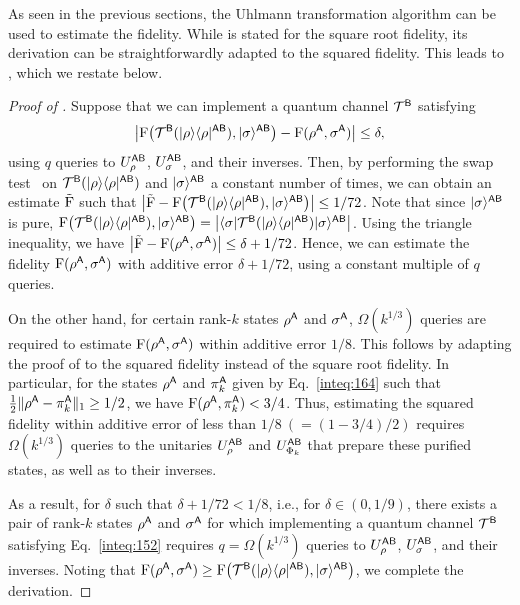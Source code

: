 As seen in the previous sections, the Uhlmann transformation algorithm can be used to estimate the fidelity. While  is stated for the square root fidelity, its derivation can be straightforwardly adapted to the squared fidelity. 
This leads to , which we restate below.



\corloweruhlquery*



\begin{proof}[Proof of ]


Suppose that we can implement a quantum channel ${\mathcal{T}}^{\mathsf{B}}$ satisfying
\begin{align}
    \label{inteq:152}
    \big|{\mathrm{F}}\big({\mathcal{T}}^{\mathsf{B}}(|\rho\rangle\langle\rho|^{{\mathsf{A}}{\mathsf{B}}}), |\sigma\rangle^{{\mathsf{A}}{\mathsf{B}}}\big) - {\mathrm{F}}(\rho^{\mathsf{A}}, \sigma^{\mathsf{A}})\big| \leq \delta,
\end{align}
using $q$ queries to $U_\rho^{{\mathsf{A}}{\mathsf{B}}}$, $U_\sigma^{{\mathsf{A}}{\mathsf{B}}}$, and their inverses.
Then, by performing the swap test~\cite{Barenco1997stabQCsymm, Buhrman2001fingerprint, Nishimura2025ASurveySWAPtest} on ${\mathcal{T}}^{\mathsf{B}}(|\rho\rangle\langle\rho|^{{\mathsf{A}}{\mathsf{B}}})$ and $|\sigma\rangle^{{\mathsf{A}}{\mathsf{B}}}$ a constant number of times, we can obtain an estimate $\tilde{{\mathrm{F}}}$ such that $\big|\tilde{{\mathrm{F}}} - {\mathrm{F}}\big({\mathcal{T}}^{\mathsf{B}}(|\rho\rangle\langle\rho|^{{\mathsf{A}}{\mathsf{B}}}), |\sigma\rangle^{{\mathsf{A}}{\mathsf{B}}}\big)\big| \leq 1/72$.
Note that since $|\sigma\rangle^{{\mathsf{A}}{\mathsf{B}}}$ is pure, ${\mathrm{F}}\big({\mathcal{T}}^{\mathsf{B}}(|\rho\rangle\langle\rho|^{{\mathsf{A}}{\mathsf{B}}}), |\sigma\rangle^{{\mathsf{A}}{\mathsf{B}}}\big) = \big|\langle\sigma|{\mathcal{T}}^{\mathsf{B}}(|\rho\rangle\langle\rho|^{{\mathsf{A}}{\mathsf{B}}})|\sigma\rangle^{{\mathsf{A}}{\mathsf{B}}}\big|$.
Using the triangle inequality, we have $\big|\tilde{{\mathrm{F}}} - {\mathrm{F}}(\rho^{\mathsf{A}}, \sigma^{\mathsf{A}})\big| \leq \delta + 1/72$.
Hence, we can estimate the fidelity ${\mathrm{F}}(\rho^{\mathsf{A}}, \sigma^{\mathsf{A}})$ with additive error $\delta + 1/72$, using a constant multiple of $q$ queries.


On the other hand, for certain rank-$k$ states $\rho^{\mathsf{A}}$ and $\sigma^{\mathsf{A}}$, $\Omega(k^{1/3})$ queries are required to estimate ${\mathrm{F}}(\rho^{\mathsf{A}}, \sigma^{\mathsf{A}})$ within additive error $1/8$.
This follows by adapting the proof of  to the squared fidelity instead of the square root fidelity. 
In particular, for the states $\rho^{\mathsf{A}}$ and $\pi_k^{\mathsf{A}}$ given by Eq.~\eqref{inteq:164} such that $\frac{1}{2}\|\rho^{\mathsf{A}} - \pi_k^{\mathsf{A}}\|_1 \geq 1/2$, we have ${\mathrm{F}}(\rho^{\mathsf{A}}, \pi_k^{\mathsf{A}}) < 3/4$. 
Thus, estimating the squared fidelity within additive error of less than $1/8 \ (= (1 - 3/4)/2)$ requires $\Omega(k^{1/3})$ queries to the unitaries $U_\rho^{{\mathsf{A}}{\mathsf{B}}}$ and $U_{\Phi_k}^{{\mathsf{A}}{\mathsf{B}}}$ that prepare these purified states, as well as to their inverses.


As a result, for $\delta$ such that $\delta + 1/72 < 1/8$, i.e., for $\delta \in (0, 1/9)$, there exists a pair of rank-$k$ states $\rho^{\mathsf{A}}$ and $\sigma^{\mathsf{A}}$ for which implementing a quantum channel ${\mathcal{T}}^{\mathsf{B}}$ satisfying Eq.~\eqref{inteq:152} requires $q = \Omega(k^{1/3})$ queries to $U_\rho^{{\mathsf{A}}{\mathsf{B}}}$, $U_\sigma^{{\mathsf{A}}{\mathsf{B}}}$, and their inverses.
Noting that ${\mathrm{F}}(\rho^{\mathsf{A}}, \sigma^{\mathsf{A}}) \geq {\mathrm{F}}\big({\mathcal{T}}^{\mathsf{B}}(|\rho\rangle\langle\rho|^{{\mathsf{A}}{\mathsf{B}}}), |\sigma\rangle^{{\mathsf{A}}{\mathsf{B}}}\big)$, we complete the derivation.


\end{proof}





